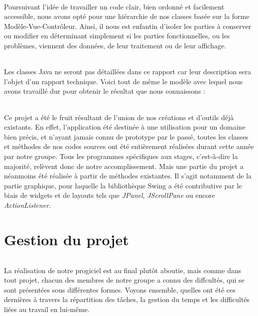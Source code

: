 \documentclass[a4paper,10pt]{report}
\begin{document}
      \paragraph{}
	Poursuivant l'idée de travailler un code clair, bien ordonné et facilement accessible, nous avons opté pour une hiérarchie de nos classes basée sur la forme Modèle-Vue-Contrôleur.
	Ainsi, il nous est enfantin d'isoler les parties à conserver ou modifier en déterminant simplement si les parties fonctionnelles, ou les problèmes, viennent des données, de leur traitement ou de leur affichage.
      
      \paragraph{}
	Les classes Java ne seront pas détaillées dans ce rapport car leur description sera l'objet d'un rapport technique.
	Voici tout de même le modèle avec lequel nous avons travaillé dur pour obtenir le résultat que nous connaissons :
	
	
	
	
	
	
      \paragraph{}
	Ce projet a été le fruit résultant de l'union de nos créations et d'outils déjà existants. 
	En effet, l'application été destinée à une utilisation pour un domaine bien précis, et n'ayant jamais connu de prototype par le passé, toutes les classes et méthodes de nos codes sources ont été entièrement réalisées durant cette année par notre groupe.
	Tous les programmes spécifiques aux stages, c'est-à-dire la majorité, relèvent donc de notre accomplissement.
	Mais une partie du projet a néanmoins été réalisée à partir de méthodes existantes. 
	Il s'agit notamment de la partie graphique, pour laquelle la bibliothèque Swing a été contributive par le biais de widgets et de layouts tels que \textit{JPanel}, \textit{JScrollPane} ou encore \textit{ActionListener}.
	
	
		
\part{Gestion du projet}
      \paragraph{}
	  La réalisation de notre progiciel est au final plutôt aboutie, mais comme dans tout projet, chacun des membres de notre groupe a connu des diffcultés, qui se sont présentées sous différentes formes.
	  Voyons ensemble, quelles ont été ces dernières à travers la répartition des tâches, la gestion du temps et les difficultés liées au travail en lui-même.
	
\end{document}
